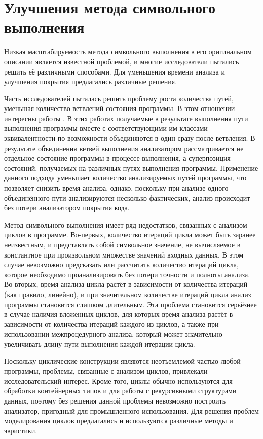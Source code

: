 \section{Улучшения метода символьного выполнения}

Низкая масштабируемость метода символьного выполнения в его оригинальном описании является известной проблемой, и многие исследователи пытались решить её различными способами. Для уменьшения времени анализа и улучшения покрытия предлагались различные решения.

Часть исследователей пыталась решить проблему роста количества путей, уменьшая количество ветвлений состояния программы. В этом отношении интересны работы \cite{trtik-thesis, trtik-merge}. В этих работах получаемые в результате выполнения пути выполнения программы вместе с соответствующими им классами эквивалентности по возможности объединяются в один сразу после ветвления. В результате объединения ветвей выполнения анализатором рассматривается не отдельное состояние программы в процессе выполнения, а суперпозиция состояний, получаемых на различных путях выполнения программы. Применение данного подхода уменьшает количество анализируемых путей программы, что позволяет снизить время анализа, однако, поскольку при анализе одного объединённого пути  анализируются несколько фактических, анализ происходит без потери анализатором покрытия кода. 

Метод символьного выполнения имеет ряд недостатков, связанных с анализом циклов в программе. Во-первых, количество итераций цикла может быть заранее неизвестным, и представлять собой символьное значение, не вычисляемое в константное при произвольном множестве значений входных данных. В этом случае невозможно предсказать или рассчитать количество итераций цикла, которое необходимо проанализировать без потери точности и полноты анализа. Во-вторых, время анализа цикла растёт в зависимости от количества итераций (как правило, линейно), и при значительном количестве итераций цикла анализ программы становится слишком длительным. Эта проблема становится серьёзнее в случае наличия вложенных циклов, для которых время анализа растёт в зависимости от количества итераций каждого из циклов, а также при использовании межпроцедурного анализа, который может значительно увеличивать длину пути выполнения каждой итерации цикла.

Поскольку циклические конструкции являются неотъемлемой частью любой программы, проблемы, связанные с анализом циклов, привлекали исследовательский интерес. Кроме того, циклы обычно используются для обработки контейнерных типов и для работы с рекурсивными структурами данных, поэтому без решения данной проблемы невозможно построить анализатор, пригодный для промышленного использования. Для решения проблем моделирования циклов предлагались и используются различные методы и эвристики. 

